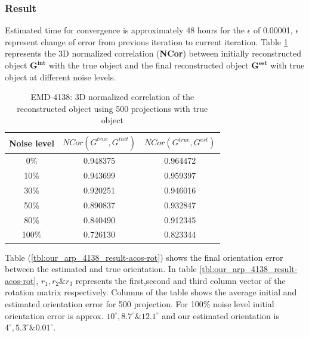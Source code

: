 \documentclass[twoside]{iitbreport}
\begin{document}
\subsubsection{\textbf{Result}}

Estimated time for convergence is approximately 48 hours for the $\epsilon$  of 0.00001, $\epsilon$ represent change of error from previous iteration to current iteration. Table \ref{tbl:our_arp_4138_result-3d-correlation} represents the 3D normalized correlation (\textbf{NCor}) between initially reconstructed object $\boldsymbol{G^{int}}$ with the true object and the final reconstructed object $\boldsymbol{G^{est}}$ with true object at different noise levels. 

\begin{table}[H]
    \centering
     \begin{tabular}{||c c c||} 
             \hline
             Noise level & $NCor(G^{true},G^{init})$  &  $NCor(G^{true},G^{est})$ \\ 
             \hline\hline
             0\% & 0.948375 & 0.964472 \\
             \hline
             10\% & 0.943699 & 0.959397 \\
             \hline
             30\% & 0.920251 & 0.946016 \\
             \hline
             50\% & 0.890837 & 0.932847 \\
             \hline
             80\% & 0.840490 & 0.912345 \\
             \hline
             100\% & 0.726130 & 0.823344 \\ [1ex] 
             \hline
    \end{tabular}
    \captionsetup{justification=centering}
    \caption{EMD-4138: 3D normalized correlation of the reconstructed object using 500 projections with true object }
    \label{tbl:our_arp_4138_result-3d-correlation}
\end{table}

Table (\ref{tbl:our_arp_4138_result-acos-rot}) shows the final orientation error between the estimated and true orientation. In table \ref{tbl:our_arp_4138_result-acos-rot}, $r_1,r_2 \& r_3$ represents the first,second and third column vector of the rotation matrix respectively. Columns of the table shows the average initial and estimated orientation error for 500 projection. For 100\% noise level initial orientation error is approx. $10^\circ, 8.7^\circ \& 12.1^\circ$ and our estimated orientation is $4^\circ,5.3^\circ \& 0.01^\circ$. 
\end{document}
